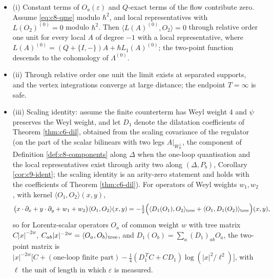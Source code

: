 \begin{proposition}
\label{prop:c8-2pt}
\begin{itemize}
\item (i) Constant terms of $O_a(\varepsilon)$ and $Q$-exact terms of the flow contribute zero. Assume \eqref{eq:c8-qme} modulo $\hbar^2$, and local representatives with $L(O_2)^{(0)}=0$ modulo $\hbar^2$. Then $\langle L(A)^{(0)},O_2\rangle=0$ through relative order one unit for every local $A$ of degree $-1$ with a local representative, where $L(A)^{(0)}=(Q+\{I,-\})A+\hbar L_1(A)^{(0)}$; the two-point function descends to the cohomology of $\Lambda^{(0)}$.
\item (ii) Through relative order one unit the limit exists at separated supports, and the vertex integrations converge at large distance; the endpoint $T=\infty$ is safe.
\item (iii) Scaling identity: assume the finite counterterm has Weyl weight $4$ and $\psi$ preserves the Weyl weight, and let $D_1$ denote the dilatation coefficients of Theorem \ref{thm:c6-dil}, obtained from the scaling covariance of the regulator (on the part of the scalar bilinears with two legs $A|_{W_{\mathbb R}^\perp}$, the component of Definition \ref{def:c8-components} along $\Delta$ when the one-loop quantisation and the local representatives exist through arity two along $(\Delta,P_b)$, Corollary \ref{cor:c9-ident}; the scaling identity is an arity-zero statement and holds with the coefficients of Theorem \ref{thm:c6-dil}). For operators of Weyl weights $w_1,w_2$, with kernel $\langle O_1,O_2\rangle(x,y)$,
\[
\big(x\cdot\partial_x+y\cdot\partial_y+w_1+w_2\big)\langle O_1,O_2\rangle(x,y)=-\tfrac12\Big(\langle D_1(O_1),O_2\rangle_{\rm tree}+\langle O_1,D_1(O_2)\rangle_{\rm tree}\Big)(x,y),
\]
so for Lorentz-scalar operators $O_a$ of common weight $w$ with tree matrix $C|x|^{-2w}$, $C_{ab}|x|^{-2w}=\langle O_a,O_b\rangle_{\rm tree}$, and $D_1(O_b)=\sum_a(D_1)_{ab}O_a$, the two-point matrix is $|x|^{-2w}\big[C+(\text{one-loop finite part})-\tfrac14(D_1^{\,T}C+CD_1)\log(|x|^2/\ell^2)\big]$, with $\ell$ the unit of length in which $\varepsilon$ is measured.
\end{itemize}
\end{proposition}

